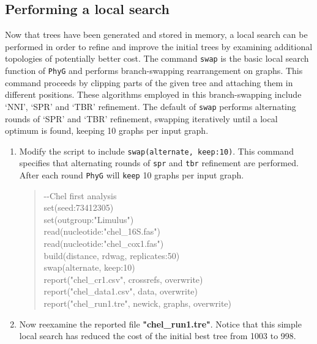 \documentclass[]{article}
\newcommand{\phyg}{\texttt{PhyG} }
\begin{document}
\subsection{Performing a local search}
\label{subsec:localsearch}

Now that trees have been generated and stored in memory, a local search can be 
performed in order to refine and improve the initial trees by examining additional 
topologies of potentially better cost. The command \texttt{swap} is the basic local 
search function of \phyg and performs branch-swapping rearrangement on graphs. 
This command proceeds by clipping parts of the given tree and attaching them in 
different positions. These algorithms employed in this branch-swapping include 
`NNI', `SPR' and `TBR' refinement. The default of \texttt{swap} performs alternating 
rounds of `SPR' and `TBR' refinement, swapping iteratively until a local optimum 
is found, keeping 10 graphs per input graph.

\begin{enumerate}

\item Modify the script to include \texttt{swap(alternate, keep:10)}. This command 
specifies that alternating rounds of \texttt{spr} and \texttt{tbr} refinement are performed. 
After each round \phyg will \texttt{keep} 10 graphs per input graph.

	\begin{quote}
	-\/-Chel first analysis\\
	set(seed:73412305)\\
	set(outgroup:"Limulus")\\
	read(nucleotide:"chel\_16S.fas")\\
	read(nucleotide:"chel\_cox1.fas")\\
	build(distance, rdwag, replicates:50)\\
	swap(alternate, keep:10)\\
	report("chel\_cr1.csv", crossrefs, overwrite)\\
	report("chel\_data1.csv", data, overwrite)\\
	report("chel\_run1.tre", newick, graphs, overwrite)\\
	\end{quote}
	
\item Now reexamine the reported file \textbf{"chel\_run1.tre"}. Notice that this 
simple local search has reduced the cost of the initial best tree from 1003 to 998.

\end{enumerate}
\end{document}
